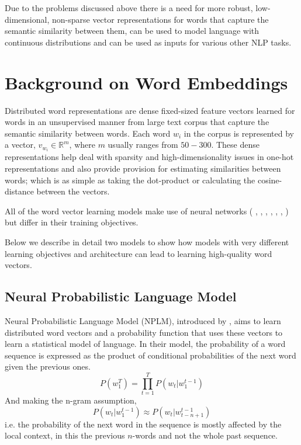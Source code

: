 Due to the problems discussed above there is a need for more robust, low-dimensional, non-sparse vector representations for words that capture the semantic similarity between them, can be used to model language with continuous distributions and can be used as inputs for various other NLP tasks. 

\section{Background on Word Embeddings}
\label{sec:background_distributed}
Distributed word representations are dense fixed-sized feature vectors learned for words in an unsupervised manner from large text corpus that capture the semantic similarity between words. Each word $w_{i}$ in the corpus is represented by a vector, $v_{w_{i}} \in \mathbb{R}^{m}$, where $m$ usually ranges from $50-300$. These dense representations help deal with sparsity and high-dimensionality issues in one-hot representations and also provide provision for estimating similarities between words; which is as simple as taking the dot-product or calculating the cosine-distance between the vectors. 

All of the word vector learning models make use of neural networks  ( \citep{bengio2003neural}, \citep{mnih2013learning}, \citep{mikolov2013distributed}, \citep{collobert2011natural}, \citep{bottou2014machine}, \citep{turian2010word}, \citep{levy2014dependencybased} ) but differ in their training objectives. 

Below we describe in detail two models to show how models with very different learning objectives and architecture can lead to learning high-quality word vectors.

\subsection{Neural Probabilistic Language Model}
\label{sec:bengio}
Neural Probabilistic Language Model (NPLM), introduced by \cite{bengio2003neural}, aims to learn distributed word vectors and a probability function that uses these vectors to learn a statistical model of language. In their model, the probability of a word sequence is expressed as the product of conditional probabilities of the next word given the previous ones. 
\begin{equation}
P(w_{1}^{T}) =  \prod_{t=1}^{T} P(w_{t}| w_{1}^{t-1})
\end{equation}
And making the n-gram assumption, 
\begin{equation}
P(w_{t} | w_{1}^{t-1}) \approx P(w_{t} | w_{t-n+1}^{t-1})
\end{equation}
i.e. the probability of the next word in the sequence is mostly affected by the local context, in this the previous $n$-words and not the whole past sequence.

